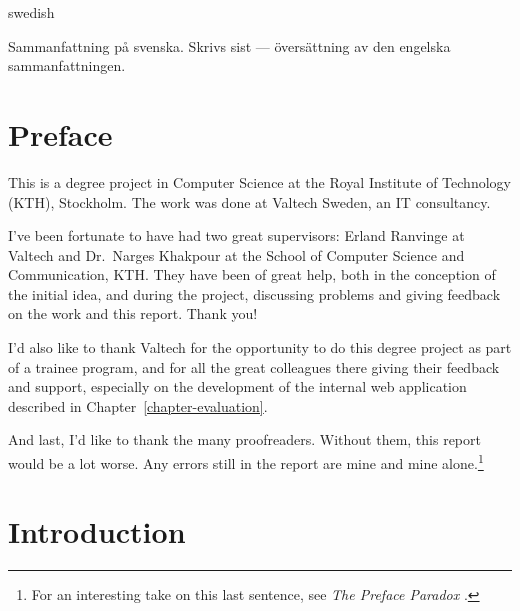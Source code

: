 \documentclass[a4paper,11pt]{kth-mag}
\begin{document}
\begin{foreignabstract}{swedish}

Sammanfattning på svenska. Skrivs sist --- översättning av den engelska
sammanfattningen.

\end{foreignabstract}
\clearpage





\pagestyle{newchap}
\chapter*{Preface}

This is a degree project in Computer Science at the Royal Institute of
Technology (KTH), Stockholm. The work was done at Valtech Sweden, an IT
consultancy.

I've been fortunate to have had two great supervisors: Erland Ranvinge at
Valtech and Dr.\ Narges Khakpour at the School of Computer Science and
Communication, KTH\@. They have been of great help, both in the conception of the
initial idea, and during the project, discussing problems and giving feedback
on the work and this report. Thank you!

I'd also like to thank Valtech for the opportunity to do this degree project as
part of a trainee program, and for all the great colleagues there giving their
feedback and support, especially on the development of the internal web
application described in Chapter~\ref{chapter-evaluation}.

And last, I'd like to thank the many proofreaders. Without them, this report
would be a lot worse. Any errors still in the report are mine and mine
alone.\footnote{For an interesting take on this last sentence, see \emph{The
Preface Paradox} \cite{makinson65prefaceparadox,
williams87prefaceparadoxdissolved}.}

\clearpage

\pagestyle{newchap}
\tableofcontents*
\mainmatter





\pagestyle{newchap}
\chapter{Introduction} \label{chapter-introduction}
\end{document}
